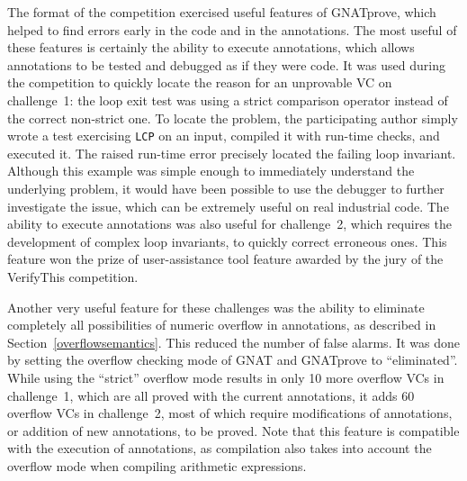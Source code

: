\documentclass[sttt,final]{svjour}
\newcommand{\gnatprove}{GNATprove\xspace}
\begin{document}
The format of the competition exercised useful features of \gnatprove,
which helped to find errors early in the code and in the
annotations. The most useful of these features is certainly the
ability to execute annotations, which allows annotations to be tested
and debugged as if they were code. It was used during the competition
to quickly locate the reason for an unprovable VC on challenge~1: the
loop exit test was using a strict comparison operator instead of the
correct non-strict one. To locate the problem, the participating
author simply wrote a test exercising \verb|LCP| on an input, compiled
it with run-time checks, and executed it. The raised run-time error
precisely located the failing loop invariant. Although this example
was simple enough to immediately understand the underlying problem, it
would have been possible to use the debugger to further investigate
the issue, which can be extremely useful on real industrial code. The
ability to execute annotations was also useful for challenge~2, which
requires the development of complex loop invariants, to quickly
correct erroneous ones. This feature won the prize of user-assistance
tool feature awarded by the jury of the VerifyThis competition.

Another very useful feature for these challenges was the ability to
eliminate completely all possibilities of numeric overflow in annotations,
as described in Section~\ref{overflowsemantics}. This reduced the number of
false alarms. It was done by setting the overflow checking mode of GNAT and
\gnatprove to ``eliminated''.  While using the ``strict'' overflow mode
results in only 10 more overflow VCs in challenge~1, which are all proved
with the current annotations, it adds 60 overflow VCs in challenge~2, most
of which require modifications of annotations, or addition of new
annotations, to be proved. Note that this feature is compatible with the
execution of annotations, as compilation also takes into account the
overflow mode when compiling arithmetic expressions.
\end{document}
